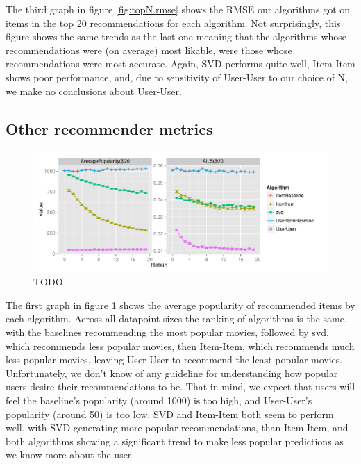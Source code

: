 \documentclass[letterpaper]{sig-alternate}
\begin{document}
  The third graph in figure \ref{fig:topN.rmse} shows the RMSE our algorithms got on items in the top 20 recommendations for each algorithm.
  Not surprisingly, this figure shows the same trends as the last one meaning that the algorithms whose recommendations were (on average) most likable, were those whose recommendations were most accurate.
  Again, SVD performs quite well, Item-Item shows poor performance, and, due to sensitivity of User-User to our choice of N, we make no conclusions about User-User.

\subsection{Other recommender metrics}

\begin{figure}[ht!]
  \centering
  \includegraphics[width=\linewidth]{../lenskit/output/ekstrandTuned20/popdiv.pdf}
  \caption{TODO}
  \label{fig:pop}
\end{figure}


  The first graph in figure \ref{fig:pop} shows the average popularity of recommended items by each algorithm.
  Across all datapoint sizes the ranking of algorithms is the same, with the baselines recommending the most popular movies, followed by svd, which recommends less popular movies, then Item-Item, which recommends much less popular movies, leaving User-User to recommend the least popular movies.
  Unfortunately, we don't know of any guideline for understanding how popular users desire their recommendations to be.
  That in mind, we expect that users will feel the baseline's popularity (around 1000) is too high, and User-User's popularity (around 50) is too low.
  SVD and Item-Item both seem to perform well, with SVD generating more popular recommendations, than Item-Item, and both algorithms showing a significant trend to make less popular predictions as we know more about the user.
\end{document}
